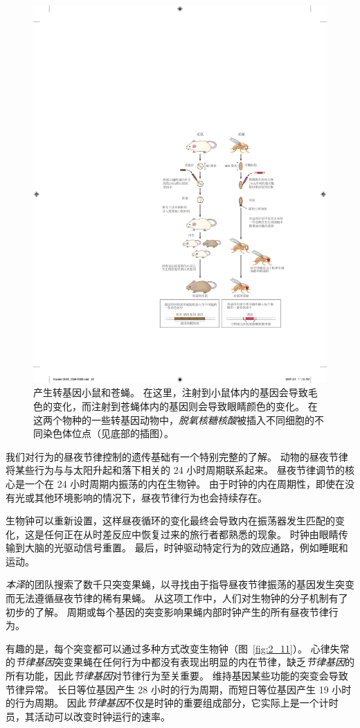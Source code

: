 \begin{figure}[htbp]
	\centering
	\includegraphics[width=0.75\linewidth]{chap02/fig_2_10}
	\caption{产生转基因小鼠和苍蝇。
		在这里，注射到小鼠体内的基因会导致毛色的变化，而注射到苍蝇体内的基因则会导致眼睛颜色的变化。
		在这两个物种的一些转基因动物中，\textit{脱氧核糖核酸}被插入不同细胞的不同染色体位点（见底部的插图）\cite{alberts2017molecular}。}
	\label{fig:2_10}
\end{figure}




我们对行为的昼夜节律控制的遗传基础有一个特别完整的了解。
动物的昼夜节律将某些行为与与太阳升起和落下相关的 24 小时周期联系起来。
昼夜节律调节的核心是一个在 24 小时周期内振荡的内在生物钟。
由于时钟的内在周期性，即使在没有光或其他环境影响的情况下，昼夜节律行为也会持续存在。


生物钟可以重新设置，这样昼夜循环的变化最终会导致内在振荡器发生匹配的变化，这是任何正在从时差反应中恢复过来的旅行者都熟悉的现象。
时钟由眼睛传输到大脑的光驱动信号重置。
最后，时钟驱动特定行为的效应通路，例如睡眠和运动。


\textit{本泽}的团队搜索了数千只突变果蝇，以寻找由于指导昼夜节律振荡的基因发生突变而无法遵循昼夜节律的稀有果蝇。
从这项工作中，人们对生物钟的分子机制有了初步的了解。
周期或每个基因的突变影响果蝇内部时钟产生的所有昼夜节律行为。


有趣的是，每个突变都可以通过多种方式改变生物钟（图~\ref{fig:2_11}）。
心律失常的\textit{节律基因}突变果蝇在任何行为中都没有表现出明显的内在节律，缺乏\textit{节律基因}的所有功能，因此\textit{节律基因}对节律行为至关重要。
维持基因某些功能的突变会导致节律异常。
长日等位基因产生 28 小时的行为周期，而短日等位基因产生 19 小时的行为周期。
因此\textit{节律基因}不仅是时钟的重要组成部分，它实际上是一个计时员，其活动可以改变时钟运行的速率。


